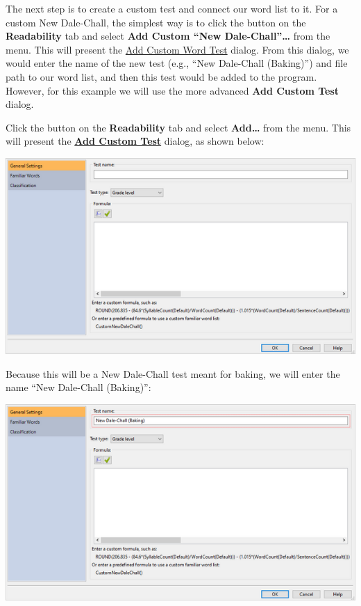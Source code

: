 \documentclass[
]{book}
\theoremstyle{definition}
\theoremstyle{definition}
\theoremstyle{definition}
\theoremstyle{definition}
\theoremstyle{remark}
\begin{document}
The next step is to create a custom test and connect our word list to it. For a custom New Dale-Chall, the simplest way is to click the  button on the \textbf{Readability} tab and select \textbf{Add Custom ``New Dale-Chall''\ldots{}} from the menu. This will present the \protect\hyperlink{add-custom-word-test}{Add Custom Word Test} dialog. From this dialog, we would enter the name of the new test (e.g., ``New Dale-Chall (Baking)'') and file path to our word list, and then this test would be added to the program. However, for this example we will use the more advanced \textbf{Add Custom Test} dialog.

Click the  button on the \textbf{Readability} tab and select \textbf{Add\ldots{}} from the menu. This will present the \protect\hyperlink{custom-test-general-settings}{\textbf{Add Custom Test}} dialog, as shown below:

\includegraphics{Images/AddCustomTest.png}

Because this will be a New Dale-Chall test meant for baking, we will enter the name ``New Dale-Chall (Baking)'':

\includegraphics{Images/CustomTestExample2Name.png}
\end{document}
